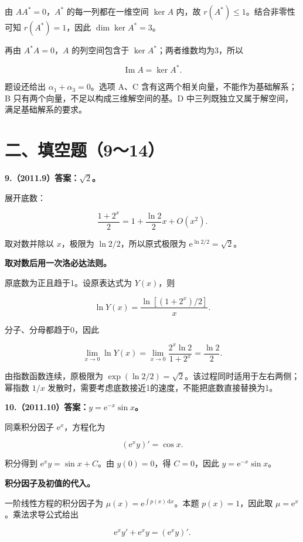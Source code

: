 \documentclass[UTF8,11pt,fontset=windows]{ctexart}
\begin{document}
由 $AA^*=0$，$A^*$ 的每一列都在一维空间 $\ker A$ 内，故 $r(A^*)\le1$。结合非零性可知 $r(A^*)=1$，因此 $\dim\ker A^*=3$。

再由 $A^*A=0$，$A$ 的列空间包含于 $\ker A^*$；两者维数均为3，所以

$$
\operatorname{Im}A=\ker A^*.
$$

题设还给出 $\alpha_1+\alpha_3=0$。选项 A、C 含有这两个相关向量，不能作为基础解系；B 只有两个向量，不足以构成三维解空间的基。D 中三列既独立又属于解空间，满足基础解系的要求。

\clearpage

\section*{二、填空题（9～14）}

\textbf{9.（2011.9）答案：$\sqrt2$。}

展开底数：

$$
\frac{1+2^x}{2}=1+\frac{\ln2}{2}x+O(x^2).
$$

取对数并除以 $x$，极限为 $\ln2/2$，所以原式极限为 $\mathrm e^{\ln2/2}=\sqrt2$。

\textbf{取对数后用一次洛必达法则。}

原底数为正且趋于1。设原表达式为 $Y(x)$，则

$$
\ln Y(x)=\frac{\ln[(1+2^x)/2]}x.
$$

分子、分母都趋于0，因此

$$
\lim_{x\to0}\ln Y(x)
=\lim_{x\to0}\frac{2^x\ln2}{1+2^x}
=\frac{\ln2}{2}.
$$

由指数函数连续，原极限为 $\exp(\ln2/2)=\sqrt2$。该过程同时适用于左右两侧；幂指数 $1/x$ 发散时，需要考虑底数接近1的速度，不能把底数直接替换为1。

\clearpage

\textbf{10.（2011.10）答案：$y=\mathrm e^{-x}\sin x$。}

同乘积分因子 $\mathrm e^x$，方程化为

$$
(\mathrm e^x y)'=\cos x.
$$

积分得到 $\mathrm e^x y=\sin x+C$。由 $y(0)=0$，得 $C=0$，因此 $y=\mathrm e^{-x}\sin x$。

\textbf{积分因子及初值的代入。}

一阶线性方程的积分因子为 $\mu(x)=\mathrm e^{\int p(x)\,\mathrm dx}$。本题 $p(x)=1$，因此取 $\mu=\mathrm e^x$。乘法求导公式给出

$$
\mathrm e^xy'+\mathrm e^xy=(\mathrm e^xy)'.
$$
\end{document}
